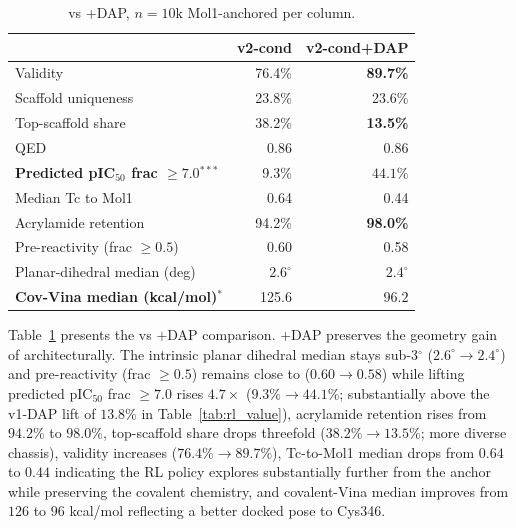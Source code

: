 \begin{table}[t]
\centering
\caption{\Cvcond{} vs \Cvcond{}+DAP, $n{=}10\text{k}$ Mol1-anchored per column.}
\label{tab:covdpo}
\small
\setlength{\tabcolsep}{6pt}
\renewcommand{\arraystretch}{1.15}
\begin{tabular}{lrr}
\toprule
                                            & \textbf{v2-cond} & \textbf{v2-cond+DAP} \\
\midrule
Validity                                    & 76.4\%           & \textbf{89.7\%}       \\
Scaffold uniqueness                         & 23.8\%           & 23.6\%                \\
Top-scaffold share                          & 38.2\%           & \textbf{13.5\%}       \\
QED                                         & 0.86             & 0.86                  \\
\textbf{Predicted pIC$_{50}$ frac $\ge 7.0$}$^{***}$ & 9.3\%     & $\mathbf{44.1\%}$      \\
Median Tc to Mol1                           & 0.64             & 0.44                  \\
Acrylamide retention                        & 94.2\%           & \textbf{98.0\%}       \\
Pre-reactivity (frac $\ge 0.5$)             & 0.60             & 0.58                  \\
Planar-dihedral median (deg)                & $2.6^\circ$      & $\mathbf{2.4^\circ}$   \\
\textbf{Cov-Vina median (kcal/mol)}$^{*}$   & 125.6            & $\mathbf{96.2}$        \\
\bottomrule
\end{tabular}
\end{table}

Table~\ref{tab:covdpo} presents the \Cvcond{} vs \Cvcond{}+DAP comparison. \Cvcond{}+DAP preserves the geometry gain of \Cvcond{} architecturally. The intrinsic planar dihedral median stays sub-3$^\circ$ ($2.6^\circ \to 2.4^\circ$) and pre-reactivity (frac $\ge 0.5$) remains close to \Cvcond{} ($0.60 \to 0.58$) while lifting predicted pIC$_{50}$ frac $\ge 7.0$ rises $4.7\times$ ($9.3\% \to 44.1\%$; substantially above the v1-DAP lift of $13.8\%$ in Table~\ref{tab:rl_value}), acrylamide retention rises from $94.2\%$ to $98.0\%$, top-scaffold share drops threefold ($38.2\% \to 13.5\%$; more diverse chassis), validity increases ($76.4\% \to 89.7\%$), Tc-to-Mol1 median drops from $0.64$ to $0.44$ indicating the RL policy explores substantially further from the anchor while preserving the covalent chemistry, and covalent-Vina median improves from $126$ to $96$ kcal/mol reflecting a better docked pose to Cys346.
